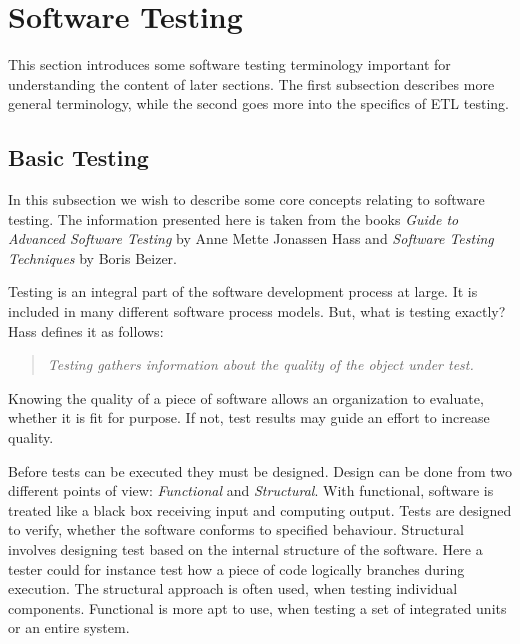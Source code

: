 \section{Software Testing}\label{sect:btesting}
This section introduces some software testing terminology important for understanding the content of later sections. The first subsection describes more general terminology, while the second goes more into the specifics of ETL testing.

\subsection{Basic Testing}
In this subsection we wish to describe some core concepts relating to software testing. The information presented here is taken from the books \textit{Guide to Advanced Software Testing} by Anne Mette Jonassen Hass\cite{Hass} and \textit{Software Testing Techniques} by Boris Beizer\cite{Beizer}.

Testing is an integral part of the software development process at large. It is included in many different software process models. But, what is testing exactly? Hass defines it as follows:
\begin{quotation} \textit{Testing gathers information about the quality of the object under test.}\end{quotation}
Knowing the quality of a piece of software allows an organization to evaluate, whether it is fit for purpose. If not, test results may guide an effort to increase quality.

Before tests can be executed they must be designed. Design can be done from two different points of view: \emph{Functional} and \emph{Structural}. With functional, software is treated like a black box receiving input and computing output. Tests are designed to verify, whether the software conforms to specified behaviour. Structural involves designing test based on the internal structure of the software. Here a tester could for instance test how a piece of code logically branches during execution. The structural approach is often used, when testing individual components. Functional is more apt to use, when testing a set of integrated units or an entire system.

